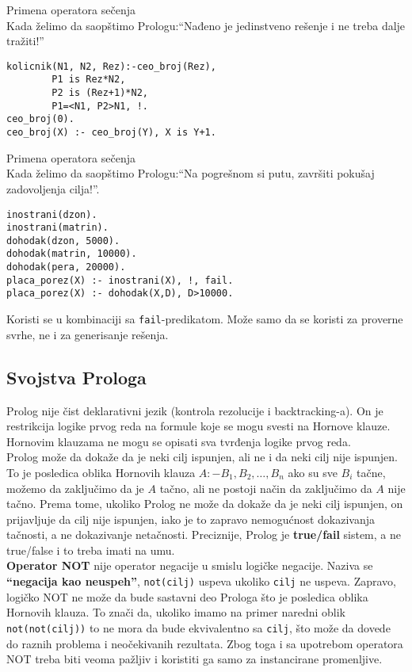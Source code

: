 \documentclass[../main.tex]{subfiles}
\begin{document}
\begin{boxprimer}
\begin{example}
Primena operatora sečenja\\
Kada želimo da saopštimo Prologu:``Nađeno je jedinstveno rešenje i ne treba dalje tražiti!''
\begin{Verbatim}
kolicnik(N1, N2, Rez):-ceo_broj(Rez),
		P1 is Rez*N2,
		P2 is (Rez+1)*N2,
		P1=<N1, P2>N1, !.
ceo_broj(0).
ceo_broj(X) :- ceo_broj(Y), X is Y+1.
\end{Verbatim}
\end{example}
\end{boxprimer} 

\begin{boxprimer}
\begin{example}
Primena operatora sečenja\\
Kada želimo da saopštimo Prologu:``Na pogrešnom si putu, završiti pokušaj zadovoljenja cilja!''.
\begin{Verbatim}
inostrani(dzon).
inostrani(matrin).
dohodak(dzon, 5000).
dohodak(matrin, 10000).
dohodak(pera, 20000).
placa_porez(X) :- inostrani(X), !, fail.
placa_porez(X) :- dohodak(X,D), D>10000.
\end{Verbatim}
\end{example}
\end{boxprimer} 
Koristi se u kombinaciji sa \texttt{fail}-predikatom. Može samo da se koristi za proverne svrhe, ne i za generisanje rešenja.

\subsection{Svojstva Prologa}
Prolog nije čist deklarativni jezik (kontrola rezolucije i backtracking-a). On je restrikcija logike prvog reda na formule koje se mogu svesti na Hornove klauze. Hornovim klauzama ne mogu se opisati sva tvrđenja logike prvog reda. 
\\
Prolog može da dokaže da je neki cilj ispunjen, ali ne i da neki cilj nije ispunjen. To je posledica oblika Hornovih klauza $A:-B_1, B_2, \ldots, B_n$ ako su sve $B_i$ tačne, možemo da zaključimo da je $A$ tačno, ali ne postoji način da zaključimo da $A$ nije tačno. Prema tome, ukoliko Prolog ne može da dokaže da je neki cilj ispunjen, on prijavljuje da cilj nije ispunjen, iako je to zapravo nemogućnost dokazivanja tačnosti, a ne dokazivanje netačnosti. Preciznije, Prolog je {\bf true/fail }sistem, a ne true/false i to treba imati na umu.
\\
{\bf Operator NOT} nije operator negacije u smislu logičke negacije. Naziva se {\bf ``negacija kao neuspeh''}, \texttt{not(cilj)} uspeva ukoliko \texttt{cilj} ne uspeva. Zapravo, logičko NOT ne može da bude sastavni deo Prologa što je posledica oblika Hornovih klauza. To znači da, ukoliko imamo na primer naredni oblik \texttt{not(not(cilj))} to ne mora da bude ekvivalentno sa \texttt{cilj}, što može da dovede do raznih problema i neočekivanih rezultata. Zbog toga i sa upotrebom operatora NOT treba biti veoma pažljiv i koristiti ga samo za instancirane promenljive.
\end{document}

